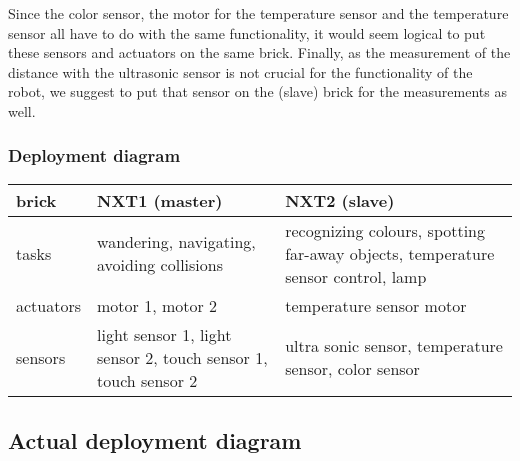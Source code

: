 \documentclass[10pt,a4paper]{article}
\begin{document}
Since the color sensor, the motor for the temperature sensor and the temperature sensor all have to do with the same functionality, it would seem logical to put these sensors and actuators on the same brick. Finally, as the measurement of the distance with the ultrasonic sensor is not crucial for the functionality of the robot, we suggest to put that sensor on the (slave) brick for the measurements as well.\\

\subsubsection*{Deployment diagram}
\begin{tabular}{|p{3cm}|p{6cm}|p{6cm}|} 
\hline
brick & NXT1 (master) & NXT2 (slave)\\
\hline
tasks & wandering, navigating, avoiding collisions & recognizing colours, spotting far-away objects, temperature sensor control, lamp\\\hline
actuators & motor 1, motor 2 & temperature sensor motor\\\hline
sensors & light sensor 1, light sensor 2, touch sensor 1, touch sensor 2 & ultra sonic sensor, temperature sensor, color sensor\\
\hline
\end{tabular}

\subsection*{Actual deployment diagram}
\end{document}
